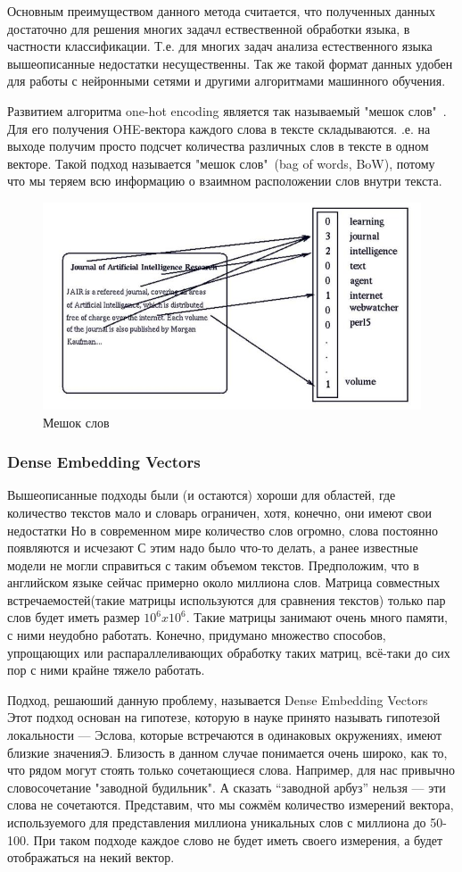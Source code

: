 Основным преимуществом данного метода считается, что полученных данных достаточно для решения многих задачл ествественной обработки языка\cite{Book26}, в частности классификации. Т.е. для многих задач анализа естественного языка вышеописанные недостатки несущественны. Так же такой формат данных удобен для работы с нейронными сетями и другими алгоритмами машинного обучения.

Развитием алгоритма one-hot encoding является так называемый "мешок слов"\ . Для его получения OHE-вектора каждого слова в тексте складываются. .е. на выходе получим просто подсчет количества различных слов в тексте в одном векторе. Такой подход называется "мешок слов"\ (bag of words, BoW), потому что мы теряем всю информацию о взаимном расположении слов внутри текста.
\begin{figure}[!h]
	\centering
	\includegraphics[width=.5\textwidth]{master_img/wordbag.jpg}
	\caption{Мешок слов}
	\label{fig03_master}
\end{figure}
\subsubsection{Dense Embedding Vectors}

Вышеописанные подходы были (и остаются) хороши для областей, где количество текстов мало и словарь ограничен, хотя, конечно, они имеют свои недостатки Но в современном мире количество слов огромно, слова постоянно появляются и исчезают С этим надо было что-то делать, а ранее известные модели не могли справиться с таким объемом текстов. Предположим, что в английском языке сейчас примерно около миллиона слов. Матрица совместных встречаемостей(такие матрицы используются для сравнения текстов) только пар слов будет  иметь размер $10^6 x 10^6$. Такие матрицы занимают очень много памяти, с ними неудобно работать. Конечно,  придумано множество способов, упрощающих или распараллеливающих обработку таких матриц, всё-таки до сих пор с ними крайне тяжело работать\cite{Book27}.

Подход, решаюший данную проблему,  называется Dense Embedding Vectors
Этот подход основан на гипотезе, которую в науке принято называть гипотезой локальности — Эслова, которые встречаются в одинаковых окружениях, имеют близкие значенияЭ. Близость в данном случае понимается очень широко, как то, что рядом могут стоять только сочетающиеся слова. Например, для нас привычно словосочетание "заводной будильник". А сказать “заводной арбуз”  нельзя — эти слова не сочетаются.
Представим, что мы сожмём количество измерений вектора, используемого для представления миллиона уникальных слов с миллиона  до 50-100. При таком подходе каждое слово не будет иметь своего измерения, а будет отображаться на некий вектор.

